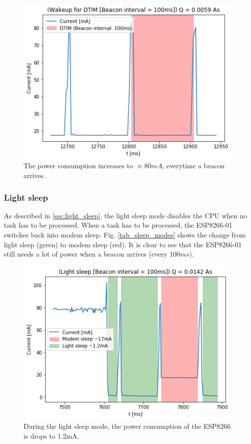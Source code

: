 \begin{figure}[H]
    \includegraphics[width = \linewidth]{fig/beacon_interval.png}
    \caption{The power consumption increases to $\approx 80mA$, everytime a beacon arrives.}
    \label{fig:beacon_interval}
\end{figure}

\subsubsection{Light sleep}
As described in \ref{sec:light_sleep}, the light sleep mode disables the CPU when no task has to be processed.
When a task has to be processed, the ESP8266-01 switches back into modem sleep.
Fig. \ref{tab_sleep_modes} shows the change from light sleep (green) to modem sleep (red).
It is clear to see that the ESP8266-01 still needs a lot of power when a beacon arrives (every $100ms$).

\begin{figure}[H]
    \includegraphics[width = \linewidth]{fig/light_sleep.png}
    \caption{During the light sleep mode, the power consumption of the ESP8266 is drops to 1.2mA.}
    \label{fig:light_sleep}
\end{figure}

